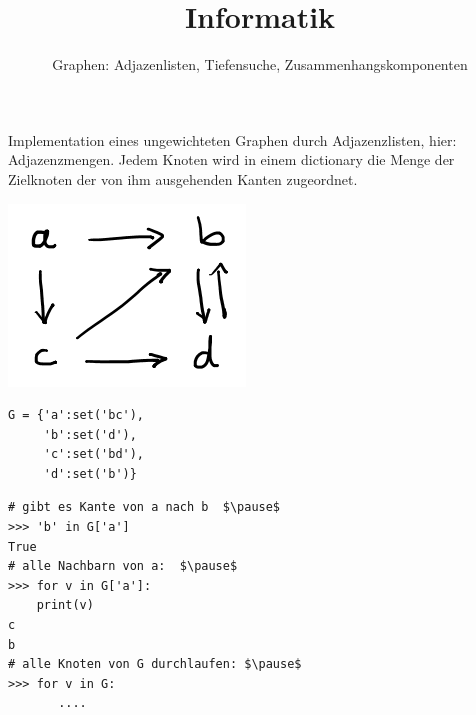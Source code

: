 \usepackage[ngerman]{babel}
\usepackage[utf8]{inputenc}
\usepackage{amsmath}
\usepackage{amssymb}
\usepackage{listings} 
\usepackage{stmaryrd}
\lstset{language=Python, tabsize=4, showstringspaces=false,basicstyle=\footnotesize,mathescape=true}  
\usepackage{mathtools}
\usepackage{ulem}
\usepackage{tikz}

\parskip 10pt




\title{Informatik}   
\author{Graphen: Adjazenlisten, Tiefensuche, Zusammenhangskomponenten} 
\date{}
\frame{\titlepage} 

\begin{frame}[fragile]
Implementation eines ungewichteten Graphen durch Adjazenzlisten, hier: Adjazenzmengen. 
Jedem Knoten wird in einem dictionary die Menge der Zielknoten der von ihm ausgehenden Kanten zugeordnet.
 
\begin{minipage}{5cm}
\includegraphics[scale=0.6]{bild30.png} 
\end{minipage} \pause
\begin{minipage}{5cm}
\begin{lstlisting} 
G = {'a':set('bc'),
     'b':set('d'), 
     'c':set('bd'),
     'd':set('b')}
\end{lstlisting}
\end{minipage} \pause

\begin{lstlisting} 
# gibt es Kante von a nach b  $\pause$
>>> 'b' in G['a']
True
# alle Nachbarn von a:  $\pause$
>>> for v in G['a']:
	print(v)
c
b
# alle Knoten von G durchlaufen: $\pause$
>>> for v in G:
       ....
\end{lstlisting}
\end{frame}

